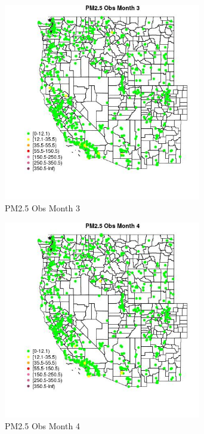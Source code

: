 \begin{figure} 
\centering  
\includegraphics[width=0.77\textwidth]{Code_Outputs/Report_ML_input_PM25_Step4_part_f_de_duplicated_aveswNAs_MapObsMo3PM25_Obs.jpg} 
\caption{\label{fig:Report_ML_input_PM25_Step4_part_f_de_duplicated_aveswNAsMapObsMo3PM25_Obs}PM2.5 Obs Month 3} 
\end{figure} 
 

\begin{figure} 
\centering  
\includegraphics[width=0.77\textwidth]{Code_Outputs/Report_ML_input_PM25_Step4_part_f_de_duplicated_aveswNAs_MapObsMo4PM25_Obs.jpg} 
\caption{\label{fig:Report_ML_input_PM25_Step4_part_f_de_duplicated_aveswNAsMapObsMo4PM25_Obs}PM2.5 Obs Month 4} 
\end{figure} 
 


